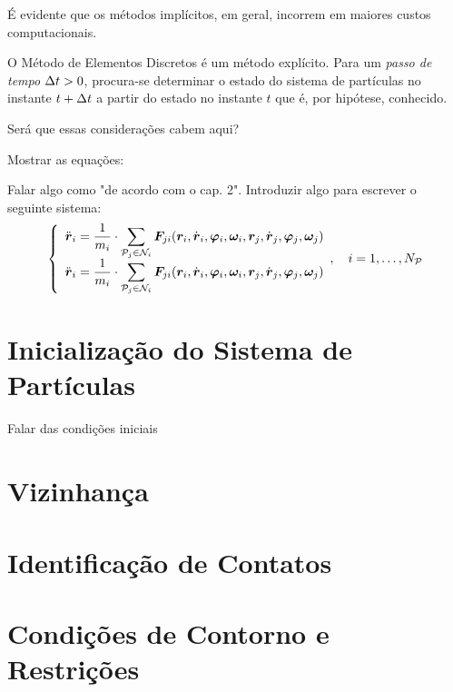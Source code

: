 É evidente que os métodos implícitos, em geral, incorrem em maiores custos computacionais. 

O Método de Elementos Discretos é um método explícito. Para um \textit{passo de tempo} \(\Delta t>0\), procura-se determinar o estado do sistema de partículas no instante \(t+\Delta t\) a partir do estado no instante \(t\) que é, por hipótese, conhecido.

\alert{Será que essas considerações cabem aqui?}

\alert{Mostrar as equações:}

\alert{Falar algo como "de acordo com o cap. 2".}
\alert{Introduzir algo para escrever o seguinte sistema:}
\begin{equation*}
	\left\lbrace
		\begin{array}{l}
			\accelerationi = \inverted{\massi}\cdot\dsum_{\particlej\in\neighborhoodi} \forceji\pqty{\positioni, \velocityi, \orientationi, \angularVelocityi, \positionj, \velocityj, \orientationj, \angularVelocityj}
			\\
			\accelerationi = \inverted{\massi}\cdot\dsum_{\particlej\in\neighborhoodi} \forceji\pqty{\positioni, \velocityi, \orientationi, \angularVelocityi, \positionj, \velocityj, \orientationj, \angularVelocityj}
		\end{array},\quad i = 1, \dots, \numberOfParticles
	\right.
\end{equation*}

\section{Inicialização do Sistema de Partículas}



\alert{Falar das condições iniciais}

\section{Vizinhança} \label{sec:neighborhood}

\section{Identificação de Contatos}

\section{Condições de Contorno e Restrições} \label{sec:boundary_condition}

